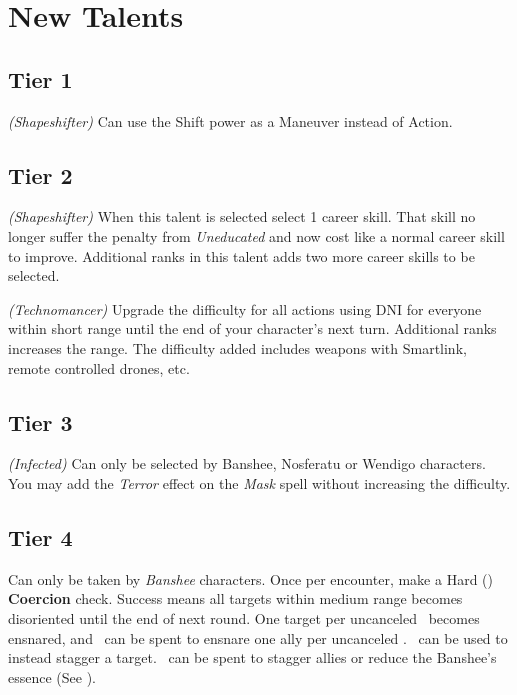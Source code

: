 \documentclass{book}
\begin{document}
\chapter{New Talents}
\begin{multicols}{2}
\section{Tier 1}
 \textit{(Shapeshifter)} Can use the Shift power as a Maneuver instead of Action.


\section{Tier 2}

 \textit{(Shapeshifter)} When this talent is selected select 1 career skill. That skill no longer suffer the penalty from \textit{Uneducated} and now cost like a normal career skill to improve. Additional ranks in this talent adds two more career skills to be selected.

 \textit{(Technomancer)} Upgrade the difficulty for all actions using DNI for everyone within short range until the end of your character's next turn. Additional ranks increases the range. The difficulty added includes weapons with Smartlink, remote controlled drones, etc.

\section{Tier 3}

 \textit{(Infected)} Can only be selected by Banshee, Nosferatu or Wendigo characters. You may add the \textit{Terror} effect on the \textit{Mask} spell without increasing the difficulty.



\section{Tier 4}
 Can only be taken by \textit{Banshee} characters. Once per encounter, make a Hard (\DifficultyDie \DifficultyDie \DifficultyDie) \textbf{Coercion} check. Success means all targets within medium range becomes disoriented until the end of next round. One target per uncanceled \Success\ becomes ensnared, and \Threat\ can be spent to ensnare one ally per uncanceled \Threat. \Triumph\ can be used to instead stagger a target. \Despair\ can be spent to stagger allies or reduce the Banshee's essence (See \pageref{sec:essenseloss}).


\end{multicols}
\end{document}

